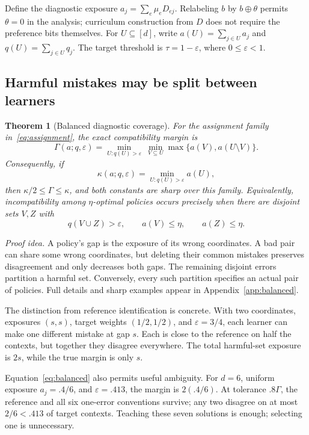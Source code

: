 \documentclass[11pt]{article}
\newtheorem{theorem}{Theorem}
\theoremstyle{definition}\newtheorem{definition}[theorem]{Definition}
\newcommand{\1}{\mathbf{1}}
\newcommand{\Gam}{\Gamma}
\newcommand{\eps}{\varepsilon}
\begin{document}
Define the diagnostic exposure $a_j=\sum_e\mu_eD_{ej}$. Relabeling $b$ by $b\oplus\theta$ permits $\theta=0$ in the analysis; curriculum construction from $D$ does not require the preference bits themselves. For $U\subseteq[d]$, write $a(U)=\sum_{j\in U}a_j$ and $q(U)=\sum_{j\in U}q_j$. The target threshold is $\tau=1-\eps$, where $0\leq\eps<1$.

\subsection{Harmful mistakes may be split between learners}
\begin{theorem}[Balanced diagnostic coverage]\label{thm:balanced}
For the assignment family in~\eqref{eq:assignment}, the exact compatibility margin is
\begin{equation}
 \Gam(a;q,\eps)=
 \min_{U:q(U)>\eps}\ \min_{V\subseteq U}
 \max\{a(V),a(U\setminus V)\}.
 \label{eq:balanced}
\end{equation}
Consequently, if
\begin{equation}
 \kappa(a;q,\eps)=\min_{U:q(U)>\eps}a(U),
\end{equation}
then $\kappa/2\leq\Gam\leq\kappa$, and both constants are sharp over this family. Equivalently, incompatibility among $\eta$-optimal policies occurs precisely when there are disjoint sets $V,Z$ with
\begin{equation}
 q(V\cup Z)>\eps,\qquad a(V)\leq\eta,\qquad a(Z)\leq\eta.
 \label{eq:two-budget}
\end{equation}
\end{theorem}
\noindent\emph{Proof idea.} A policy's gap is the exposure of its wrong coordinates. A bad pair can share some wrong coordinates, but deleting their common mistakes preserves disagreement and only decreases both gaps. The remaining disjoint errors partition a harmful set. Conversely, every such partition specifies an actual pair of policies. Full details and sharp examples appear in Appendix~\ref{app:balanced}.

The distinction from reference identification is concrete. With two coordinates, exposures $(s,s)$, target weights $(1/2,1/2)$, and $\eps=3/4$, each learner can make one different mistake at gap $s$. Each is close to the reference on half the contexts, but together they disagree everywhere. The total harmful-set exposure is $2s$, while the true margin is only $s$.

Equation~\eqref{eq:balanced} also permits useful ambiguity. For $d=6$, uniform exposure $a_j=.4/6$, and $\eps=.413$, the margin is $2(.4/6)$. At tolerance $.8\Gam$, the reference and all six one-error conventions survive; any two disagree on at most $2/6<.413$ of target contexts. Teaching these seven solutions is enough; selecting one is unnecessary.
\end{document}
